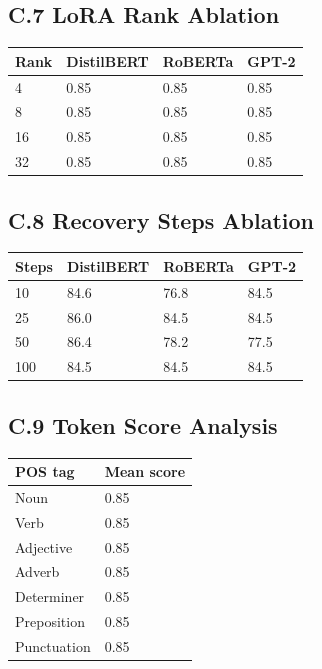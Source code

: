 \subsection{C.7 LoRA Rank Ablation}

\begin{table}[H]
\centering
\small
\begin{tabular}{llll}
\toprule
\textbf{Rank} & \textbf{DistilBERT} & \textbf{RoBERTa} & \textbf{GPT-2} \\
\midrule
4 & 0.85 & 0.85 & 0.85 \\
8 & 0.85 & 0.85 & 0.85 \\
16 & 0.85 & 0.85 & 0.85 \\
32 & 0.85 & 0.85 & 0.85 \\
\bottomrule
\end{tabular}
\end{table}

\subsection{C.8 Recovery Steps Ablation}

\begin{table}[H]
\centering
\small
\begin{tabular}{llll}
\toprule
\textbf{Steps} & \textbf{DistilBERT} & \textbf{RoBERTa} & \textbf{GPT-2} \\
\midrule
10 & 84.6 & 76.8 & 84.5 \\
25 & 86.0 & 84.5 & 84.5 \\
50 & 86.4 & 78.2 & 77.5 \\
100 & 84.5 & 84.5 & 84.5 \\
\bottomrule
\end{tabular}
\end{table}

\subsection{C.9 Token Score Analysis}

\begin{table}[H]
\centering
\small
\begin{tabular}{ll}
\toprule
\textbf{POS tag} & \textbf{Mean score} \\
\midrule
Noun & 0.85 \\
Verb & 0.85 \\
Adjective & 0.85 \\
Adverb & 0.85 \\
Determiner & 0.85 \\
Preposition & 0.85 \\
Punctuation & 0.85 \\
\bottomrule
\end{tabular}
\end{table}

